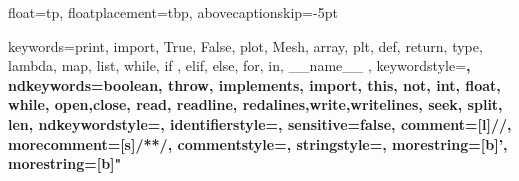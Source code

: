   {
  float=tp,
  floatplacement=tbp,
  abovecaptionskip=-5pt
  }

  {
  keywords={print, import, True, False, plot, Mesh, array, plt, def, return, type, lambda, map, list, while, if , elif, else, for, in, __name__ },
  keywordstyle=\color{blue}\bfseries,
  ndkeywords={boolean, throw, implements, import, this, not, int, float, while, open,close, read, readline, redalines,write,writelines, seek, split, len},
  ndkeywordstyle=\color{red}\bfseries,
  identifierstyle=\color{black},
  sensitive=false,
  comment=[l]{//},
  morecomment=[s]{/*}{*/},
  commentstyle=\color{purple}\ttfamily,
  stringstyle=\color{red}\ttfamily,
  morestring=[b]',
  morestring=[b]"
}




\renewcommand{\lstlistingname}{\scriptsize Código}

\usepackage{inconsolata}
